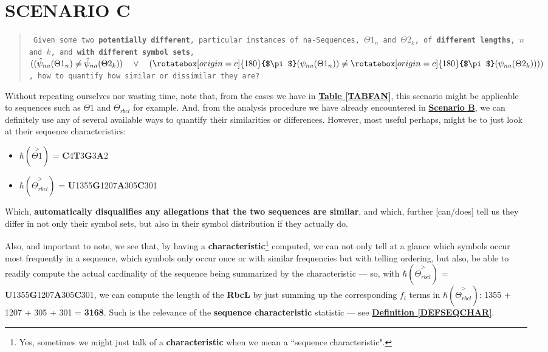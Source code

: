 \documentclass[a4paper, 18pt]{book} %
\newcommand{\invpi}{\rotatebox[origin=c]{180}{$\pi$}}
\begin{document}
\section{SCENARIO C}
\label{SECSCENC}

\begin{quote}
\small
\texttt{
Given some two \textbf{potentially different}, particular instances of na-Sequences, $\Theta1_n$ and $\Theta2_k$, of \textbf{different lengths}, $n$ and $k$, and \textbf{with different symbol sets}, $((\hat{\psi}_{na}(\Theta1_n) \neq \hat{\psi}_{na}(\Theta2_k)) \quad \lor \quad (\invpi(\psi_{na}(\Theta1_n)) \neq \invpi(\psi_{na}(\Theta2_k))))$, how to quantify how similar or dissimilar they are?}
\end{quote}

Without repeating ourselves nor wasting time, note that, from the cases we have in \textbf{\hyperref[TABFAN]{Table \ref{TABFAN}}}, this scenario might be applicable to sequences such as $\Theta1$ and $\Theta_{rbcl}$ for example. And, from the analysis procedure we have already encountered in \textbf{\hyperref[SECSCENB]{Scenario B}}, we can definitely use any of several available ways to quantify their similarities or differences. However, most useful perhaps, might be to just look at their sequence characteristics:

\begin{itemize}
\item $\hbar(\overset{>}{\Theta1})$ = \textbf{C}4\textbf{T}3\textbf{G}3\textbf{A}2
\item $\hbar(\overset{>}{\Theta_{rbcl}})$ = \textbf{U}1355\textbf{G}1207\textbf{A}305\textbf{C}301
\end{itemize}

Which, \textbf{automatically disqualifies any allegations that the two sequences are similar}, and which, further [can/does] tell us they differ in not only their symbol sets, but also in their symbol distribution if they actually do.

Also, and important to note, we see that, by having a \textbf{characteristic}\footnote{Yes, sometimes we might just talk of a \textbf{characteristic} when we mean a ``sequence characteristic".} computed, we can not only tell at a glance which symbols occur most frequently in a sequence, which symbols only occur once or with similar frequencies but with telling ordering, but also, be able to readily compute the actual cardinality of the sequence being summarized by the characteristic --- so, with $\hbar(\overset{>}{\Theta_{rbcl}})$ = \textbf{U}1355\textbf{G}1207\textbf{A}305\textbf{C}301, we can compute the length of the \textbf{RbcL} by just summing up the corresponding $f_i$ terms in $\hbar(\overset{>}{\Theta_{rbcl}})$: 1355 + 1207 + 305 + 301 = \textbf{3168}. Such is the relevance of the \textbf{sequence characteristic} statistic --- see \textbf{\hyperref[DEFSEQCHAR]{Definition \ref{DEFSEQCHAR}}}. 
\end{document}
